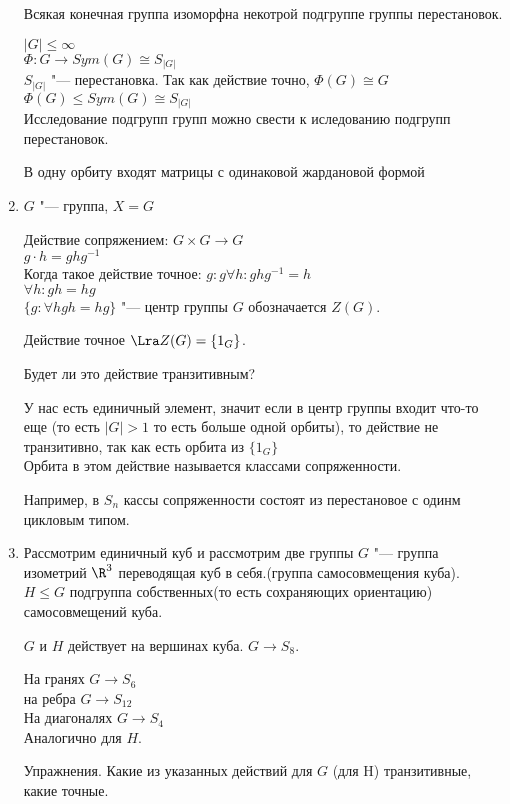 \begin{exmp}
\begin{enumerate}
\begin{conseq}
Всякая конечная группа изоморфна некотрой подгруппе группы перестановок.

$|G| \le \infty$ \\
$\Phi \colon G \to Sym(G)\cong S_{|G|}$\\
$S_{|G|}$ "--- перестановка.
Так как действие точно, $\Phi(G) \cong G$\\
$\Phi(G) \le Sym(G) \cong S_{|G|}$\\

Исследование подгрупп групп можно свести к иследованию подгрупп перестановок.
\begin{Rem}
  В одну орбиту входят матрицы с одинаковой жардановой формой
\end{Rem}
\end{conseq}
\item
$G$ "--- группа, $X = G$

Действие сопряжением:
$G \times G \to G$\\
$g \cdot h = ghg^{-1}$\\
Когда такое действие точное:
$g \colon g \forall h \colon ghg^{-1} = h$\\
$\forall h \colon gh = hg$ \\
$\{g \colon \forall h gh = hg\} $ "--- центр группы $G$ обозначается $Z(G)$.

Действие точное $\Lra Z(G) = \{1_{G}\}$.

Будет ли это действие транзитивным?

У нас есть единичный элемент, значит если в центр группы входит что-то еще (то есть $|G| > 1$ то есть больше одной орбиты), то 
действие не транзитивно, так  как есть орбита из $\{1_G\}$\\

Орбита в этом действие называется классами сопряженности.

Например, в $S_n$ кассы сопряженности состоят из перестановое с одинм цикловым типом.
\item
Рассмотрим единичный куб и рассмотрим две группы 
$G$ "--- группа изометрий $\R^3$ переводящая куб в себя.(группа самосовмещения куба).
$H \le G$ подгруппа собственных(то есть сохраняющих ориентацию) самосовмещений куба.

$G$ и $H$ действует на вершинах куба.
$G \to S_8$.

На гранях $G \to S_6$\\
на ребра $G \to S_{12}$\\
На диагоналях $G \to S_4$\\

Аналогично для $H$.


Упражнения. Какие из указанных действий для $G$ (для H) транзитивные, 
какие точные.
\end{enumerate}
\end{exmp}
                       
